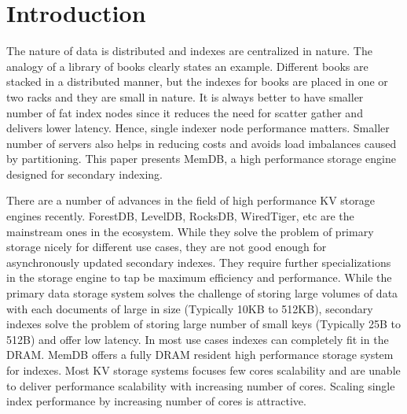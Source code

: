 \documentclass{vldb}
\begin{document}
\section{Introduction}
The nature of data is distributed and indexes are centralized in nature. The analogy of a library of books clearly states an example. Different books are stacked in a distributed manner, but the indexes for books are placed in one or two racks and they are small in nature. It is always better to have smaller number of fat index nodes since it reduces the need for scatter gather and delivers lower latency. Hence, single indexer node performance matters. Smaller number of servers also helps in reducing costs and avoids load imbalances caused by partitioning. This paper presents MemDB, a high performance storage engine designed for secondary indexing.

    There are a number of advances in the field of high performance KV storage engines recently. ForestDB, LevelDB, RocksDB, WiredTiger, etc are the mainstream ones in the ecosystem. While they solve the problem of primary storage nicely for different use cases, they are not good enough for asynchronously updated secondary indexes. They require further specializations in the storage engine to tap be maximum efficiency and performance. While the primary data storage system solves the challenge of storing large volumes of data with each documents of large in size (Typically 10KB to 512KB), secondary indexes solve the problem of storing large number of small keys (Typically 25B to 512B) and offer low latency. In most use cases indexes can completely fit in the DRAM. MemDB offers a fully DRAM resident high performance storage system for indexes. Most KV storage systems focuses few cores scalability and are unable to deliver performance scalability with increasing number of cores. Scaling single index performance by increasing number of cores is attractive.
    
\end{document}
